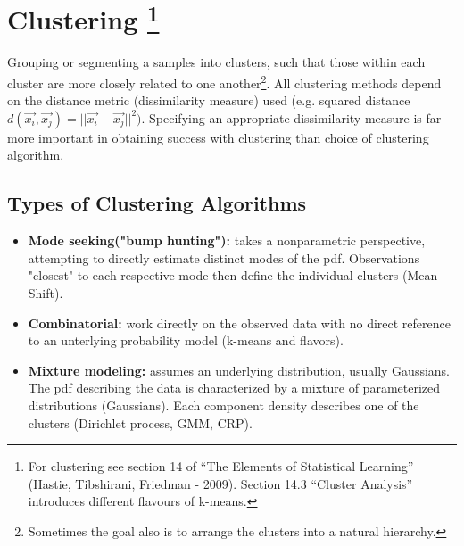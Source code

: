 
\section*{Clustering \footnote{For clustering see section 14 of ``The Elements of Statistical Learning'' (Hastie, Tibshirani, Friedman - 2009). Section 14.3 ``Cluster Analysis'' introduces different flavours of k-means. }}
Grouping or segmenting a samples into clusters, such that those within each cluster are more closely related to one another\footnote{Sometimes the goal also is to arrange the clusters into a natural hierarchy.}. All clustering methods depend on the distance metric (dissimilarity measure) used (e.g. squared distance \(d(\vec{x_i}, \vec{x_j}) = ||\vec{x_i} - \vec{x_j}||^2)\). Specifying an appropriate dissimilarity measure is far more important in obtaining success with clustering than choice of clustering algorithm.

\subsection*{Types of Clustering Algorithms}
\begin{itemize}
    \item \textbf{Mode seeking("bump hunting"):} takes a nonparametric perspective, attempting to directly estimate distinct modes of the pdf. Observations "closest" to each respective mode then define the individual clusters (Mean Shift).
    \item \textbf{Combinatorial:} work directly on the observed data with no direct reference to an unterlying probability model (k-means and flavors).
    \item \textbf{Mixture modeling:} assumes an underlying distribution, usually Gaussians. The pdf describing the data is characterized by a mixture of parameterized distributions (Gaussians). Each component density describes one of the clusters (Dirichlet process, GMM, CRP).
\end{itemize}
